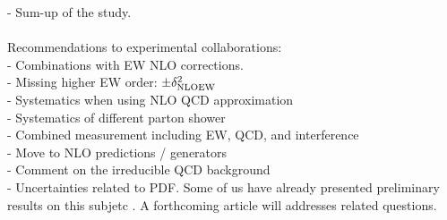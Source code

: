
- Sum-up of the study. \\

 \\
Recommendations to experimental collaborations: \\
- Combinations with EW NLO corrections. \\
- Missing higher EW order: $\pm \delta^2_{\rm NLO EW}$ \\
- Systematics when using NLO QCD approximation \\
- Systematics of different parton shower \\
- Combined measurement including  EW, QCD, and interference \\
- Move to NLO predictions / generators \\
- Comment on the irreducible QCD background \\
- Uncertainties related to PDF.
Some of us have already presented preliminary results on this subjetc \cite{}. %
A forthcoming article will addresses related questions.